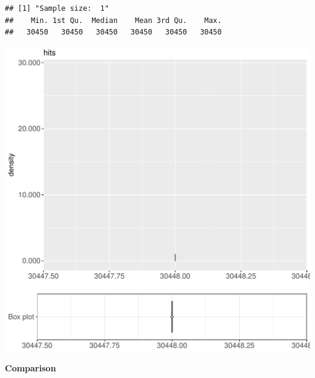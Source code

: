 \documentclass{article}\usepackage[]{graphicx}\usepackage[]{color}
\makeatletter
\def\maxwidth{ %
  \ifdim\Gin@nat@width>\linewidth
    \linewidth
  \else
    \Gin@nat@width
  \fi
}
\newenvironment{kframe}{%
 \def\at@end@of@kframe{}%
 \ifinner\ifhmode%
  \def\at@end@of@kframe{\end{minipage}}%
  \begin{minipage}{\columnwidth}%
 \fi\fi%
 \def\FrameCommand##1{\hskip\@totalleftmargin \hskip-\fboxsep
 \colorbox{shadecolor}{##1}\hskip-\fboxsep
     \hskip-\linewidth \hskip-\@totalleftmargin \hskip\columnwidth}%
 \MakeFramed {\advance\hsize-\width
   \@totalleftmargin\z@ \linewidth\hsize
   \@setminipage}}%
 {\par\unskip\endMakeFramed%
 \at@end@of@kframe}
\newenvironment{knitrout}{}{} %
\makeatother
\begin{document}
\begin{knitrout}
\color{fgcolor}\begin{kframe}
\begin{verbatim}
## [1] "Sample size:  1"
##    Min. 1st Qu.  Median    Mean 3rd Qu.    Max. 
##   30450   30450   30450   30450   30450   30450
\end{verbatim}


{\ttfamily\noindent\bfseries{}}\end{kframe}
\includegraphics[width=\maxwidth]{figure/RH3_trivialcaching_password2-1} 

\end{knitrout}
  
 \textbf{Comparison}
  
\end{document}
